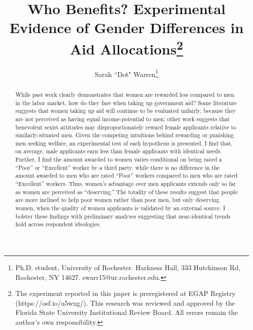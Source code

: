 \documentclass[12pt]{article}%
\author{Sarah ``Dot" Warren\thanks{Ph.D. student, University of Rochester. Harkness Hall, 333 Hutchinson Rd, Rochester, NY 14627. swarr15@ur.rochester.edu.}}
\title{Who Benefits? Experimental Evidence of Gender Differences in Aid Allocations\thanks{The experiment reported in this paper is preregistered at EGAP Registry (https://osf.io/u5wxg/). This research was reviewed and approved by the Florida State University Institutional Review Board. All errors remain the author's own responsibility.}}
\begin{document}
\maketitle
\thispagestyle{empty}


\begin{abstract}
While past work clearly demonstrates that women are rewarded less compared to men in the labor market, how do they fare when taking up government aid? Some literature suggests that women taking up aid will continue to be evaluated unfairly, because they are not perceived as having equal income-potential to men; other work suggests that benevolent sexist attitudes may disproportionately reward female applicants relative to similarly-situated men. Given the competing intuitions behind rewarding or punishing men seeking welfare, an experimental test of each hypothesis is presented. I find that, on average, male applicants earn less than female applicants with identical needs. Further, I find the amount awarded to women varies conditional on being rated a ``Poor” or ``Excellent” worker by a third party, while there is no difference in the amount awarded to men who are rated ``Poor” workers compared to men who are rated ``Excellent” workers. Thus, women’s advantage over men applicants extends only so far as women are perceived as ``deserving.” The totality of these results suggest that people are more inclined to help poor women rather than poor men, but only deserving women, when the quality of women applicants is validated by an external source. I bolster these findings with preliminary analyses suggesting that near-identical trends hold across respondent ideologies. %
\end{abstract}


\newpage

\end{document}
